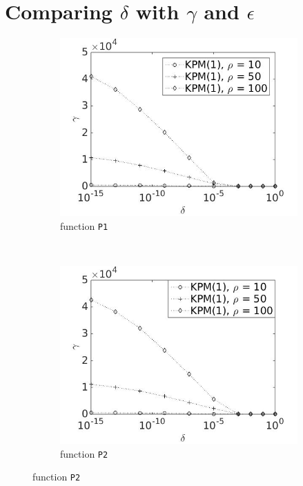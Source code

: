\section{Comparing $\delta$ with $\gamma$ and $\epsilon$} \label{sec:div}
\begin{figure}[H]
        \centering
        \begin{subfigure}[b]{0.45\textwidth}
                \includegraphics[width=\textwidth]{fig/s13antvstol1m}
                \caption{function \texttt{P1}}
                \label{fig:errant1}
        \end{subfigure}
~
        \begin{subfigure}[b]{0.45\textwidth}
                \includegraphics[width=\textwidth]{fig/s14antvstol2m}
                \caption{ function \texttt{P2}}
                \label{fig:errant2}
        \end{subfigure}
        

\end{figure}
